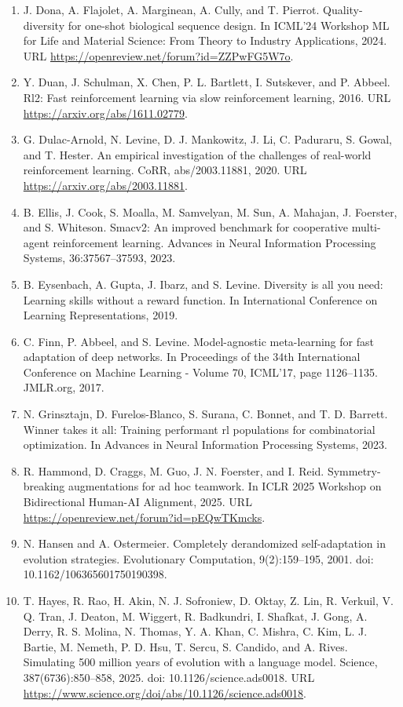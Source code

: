 \documentclass[11pt,UTF8,fontset=fandol]{ctexart}
\begin{document}
\begin{enumerate}[leftmargin=2em,itemsep=2pt]
\item J. Dona, A. Flajolet, A. Marginean, A. Cully, and T. Pierrot. Quality-diversity for one-shot biological sequence design. In ICML'24 Workshop ML for Life and Material Science: From Theory to Industry Applications, 2024. URL \url{https://openreview.net/forum?id=ZZPwFG5W7o}.
\item Y. Duan, J. Schulman, X. Chen, P. L. Bartlett, I. Sutskever, and P. Abbeel. Rl2: Fast reinforcement learning via slow reinforcement learning, 2016. URL \url{https://arxiv.org/abs/1611.02779}.
\item G. Dulac-Arnold, N. Levine, D. J. Mankowitz, J. Li, C. Paduraru, S. Gowal, and T. Hester. An empirical investigation of the challenges of real-world reinforcement learning. CoRR, abs/2003.11881, 2020. URL \url{https://arxiv.org/abs/2003.11881}.
\item B. Ellis, J. Cook, S. Moalla, M. Samvelyan, M. Sun, A. Mahajan, J. Foerster, and S. Whiteson. Smacv2: An improved benchmark for cooperative multi-agent reinforcement learning. Advances in Neural Information Processing Systems, 36:37567--37593, 2023.
\item B. Eysenbach, A. Gupta, J. Ibarz, and S. Levine. Diversity is all you need: Learning skills without a reward function. In International Conference on Learning Representations, 2019.
\item C. Finn, P. Abbeel, and S. Levine. Model-agnostic meta-learning for fast adaptation of deep networks. In Proceedings of the 34th International Conference on Machine Learning - Volume 70, ICML'17, page 1126--1135. JMLR.org, 2017.
\item N. Grinsztajn, D. Furelos-Blanco, S. Surana, C. Bonnet, and T. D. Barrett. Winner takes it all: Training performant rl populations for combinatorial optimization. In Advances in Neural Information Processing Systems, 2023.
\item R. Hammond, D. Craggs, M. Guo, J. N. Foerster, and I. Reid. Symmetry-breaking augmentations for ad hoc teamwork. In ICLR 2025 Workshop on Bidirectional Human-AI Alignment, 2025. URL \url{https://openreview.net/forum?id=pEQwTKmcks}.
\item N. Hansen and A. Ostermeier. Completely derandomized self-adaptation in evolution strategies. Evolutionary Computation, 9(2):159--195, 2001. doi: 10.1162/106365601750190398.
\item T. Hayes, R. Rao, H. Akin, N. J. Sofroniew, D. Oktay, Z. Lin, R. Verkuil, V. Q. Tran, J. Deaton, M. Wiggert, R. Badkundri, I. Shafkat, J. Gong, A. Derry, R. S. Molina, N. Thomas, Y. A. Khan, C. Mishra, C. Kim, L. J. Bartie, M. Nemeth, P. D. Hsu, T. Sercu, S. Candido, and A. Rives. Simulating 500 million years of evolution with a language model. Science, 387(6736):850--858, 2025. doi: 10.1126/science.ads0018. URL \url{https://www.science.org/doi/abs/10.1126/science.ads0018}.

\end{enumerate}
\end{document}
